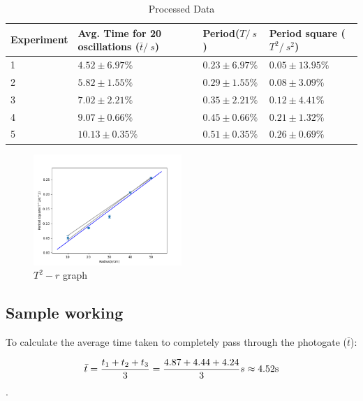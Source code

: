 \documentclass[a4paper]{article}
\begin{document}
\begin{table}[ht!]\centering
    \caption{Processed Data}
    \label{tab.prod}
    \begin{tabular}{llll}
        \hline
        Experiment & Avg. Time for 20 oscillations ($\bar{t}/\SI{}{s}$) & Period($T/\SI{}{s}$) & Period square ($T^2/\SI{}{s^2}$) \\ \hline
        1          & $ 4.52 \pm 6.97\% $                                & $ 0.23 \pm 6.97\% $  & $ 0.05 \pm 13.95\% $             \\
        2          & $ 5.82 \pm 1.55\% $                                & $ 0.29 \pm 1.55\% $  & $ 0.08 \pm 3.09\% $              \\
        3          & $ 7.02 \pm 2.21\% $                                & $ 0.35 \pm 2.21\% $  & $ 0.12 \pm 4.41\% $              \\
        4          & $ 9.07 \pm 0.66\% $                                & $ 0.45 \pm 0.66\% $  & $ 0.21 \pm 1.32\% $              \\
        5          & $ 10.13 \pm 0.35\% $                               & $ 0.51 \pm 0.35\% $  & $ 0.26 \pm 0.69\% $              \\ \hline
    \end{tabular}
\end{table}


\begin{figure}[h!]
    \centering
    \caption{$T^2 - r$ graph}
    \includegraphics[width = 0.5\textwidth]{Figure_1.png}
\end{figure}

\subsection{Sample working}
To calculate the average time taken to completely pass through the photogate ($\bar{t}$):

$$\bar{t} = {{t_1+t_2+t_3}\over 3} = {{4.87+4.44+4.24} \over 3} s \approx 4.52 \SI{}{s}$$.
    
\end{document}
